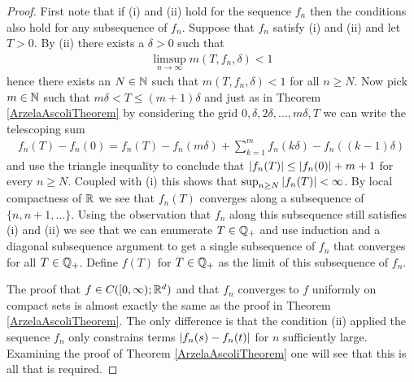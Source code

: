 \begin{proof}
First note that if (i) and (ii) hold for the sequence $f_n$ then the conditions also hold for any subsequence of $f_n$.  
Suppose that $f_n$ satisfy (i) and (ii) and let $T > 0$.  By (ii) there exists a $\delta > 0$ such that 
\begin{align*}
\limsup_{n \to \infty} m(T, f_n,  \delta)  < 1
\end{align*}
hence there exists an $N \in \mathbb{N}$ such that $m(T, f_n,  \delta)  < 1$ for all $n \geq N$.  Now pick $m \in \mathbb{N}$ such 
that $m \delta < T \leq (m+1)\delta$ and just as in Theorem \ref{ArzelaAscoliTheorem}  by considering  the grid $0, \delta, 2\delta, \dotsc,
m\delta, T$ we can write the telescoping sum
\begin{align*}
f_n(T) - f_n(0) = f_n(T) - f_n(m\delta) + \sum_{k=1}^m f_n(k \delta) - f_n((k-1)\delta)
\end{align*}
and use the triangle inequality to conclude that $\left \vert f_n(T) \right \vert
\leq \left \vert f_n(0) \right \vert + m+1$ for every $n \geq N$.  Coupled with (i) this shows that
$\sup_{n \geq N} \left \vert f_n(T) \right \vert < \infty$.  By local compactness of $\mathbb{R}$ we see that  $f_n(T)$ converges 
along a subsequence of $\lbrace n, n+1, \dotsc \rbrace$.  Using the observation that $f_n$ along this subsequence still satisfies
(i) and (ii) we see that we can enumerate $T \in \mathbb{Q}_+$ and use induction and a diagonal subsequence argument to get a 
single subsequence of $f_n$ that converges for all $T \in \mathbb{Q}_+$.  Define $f(T)$ for $T \in \mathbb{Q}_+$ as the limit of this subsequence of $f_n$.  

The proof that $f \in C([0,\infty); \mathbb{R}^d)$ and that $f_n$ converges to $f$ uniformly on compact sets is almost exactly the same as the proof in Theorem
\ref{ArzelaAscoliTheorem}.  The only difference is that the condition (ii) applied the sequence $f_n$ only constrains terms $\left \vert f_n(s) - f_n(t) \right \vert$ for $n$ sufficiently large.  Examining the proof of Theorem \ref{ArzelaAscoliTheorem} one will see that this is all that is required.
\end{proof}

